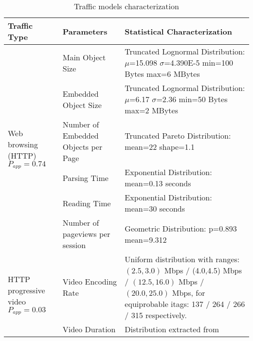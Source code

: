 \documentclass[conference]{IEEEtran}
\begin{document}
\begin{table*}[tb]
\centering
\caption{Traffic models characterization}
\label{tab:traffic-models}
{\small
\begin{tabularx}{\textwidth}{l|l|X}
\hline
\hline
Traffic Type	& Parameters	& Statistical  Characterization \\                                                      \hline
\hline
\multirow{6}{*}{\parbox[t]{1.7cm}{\centering Web \\browsing \\(HTTP) $P_{app}=0.74$}}	& Main Object Size	& Truncated Lognormal Distribution: $\mu$=15.098 $\sigma$=4.390E-5 min=100 Bytes max=6 MBytes 	\\  \cline{2-3}                                                                            
                                        & Embedded Object Size	& Truncated Lognormal Distribution: $\mu$=6.17 $\sigma$=2.36 min=50 Bytes max=2 MBytes
\\ \cline{2-3}
                                        & Number of Embedded Objects per Page & Truncated Pareto Distribution: mean=22 shape=1.1
\\ \cline{2-3}
                                        & Parsing Time                        & Exponential Distribution: mean=0.13 seconds
\\ \cline{2-3}
                                        & Reading Time                        & Exponential Distribution: mean=30 seconds
                                        \\ \cline{2-3}
                                        & Number of pageviews per session     & Geometric Distribution: p=0.893 mean=9.312
                                        \\ \cline{2-3}
\hline
\multirow{4}{*}{\parbox[t]{1.7cm}{\centering HTTP \\progressive \\video $P_{app}=0.03$}} & Video Encoding Rate                 & Uniform distribution with ranges:  $(2.5, 3.0)$ Mbps / (4.0,4.5) Mbps / $(12.5, 16.0)$ Mbps / $(20.0,25.0)$ Mbps, for equiprobable itags: 137 / 264 / 266 / 315 respectively. \\ \cline{2-3}
                                        & Video Duration                      & Distribution extracted from \cite{Ameigeiras12}                                                                                                                                                                                                  \\ \cline{2-3}

\end{tabularx}}
\end{table*}
\end{document}
